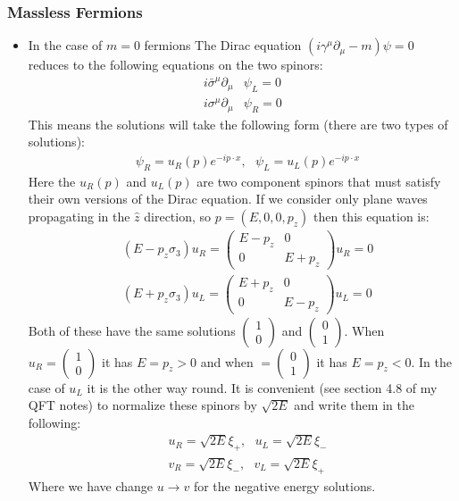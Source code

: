 \documentclass[11pt]{article}
\numberwithin{equation}{section}
\begin{document}
\subsubsection{Massless Fermions} %
\label{ssub:massless_fermions}
\begin{itemize}
    \item In the case of $m=0$ fermions The Dirac equation $(i\gamma^{\mu}\partial_{\mu}-m)\psi = 0$ reduces to the following equations on the two spinors:
    \begin{align*}
         i\bar{\sigma}^{\mu}\partial_{\mu}&\psi_{L} = 0 \\
      i\sigma^{\mu}\partial_{\mu}& \psi_{R} =0 
    \end{align*}
    This means the solutions will take the following form (there are two types of solutions):
    \begin{align}
    \label{spinor_ansatz}
        &\psi_{R} = u_{R}(p)e^{-ip \cdot x}, ~~~ \psi_{L} = u_{L}(p)e^{-ip \cdot x}
    \end{align}
    Here the $u_R(p)$ and $u_L(p)$  are two component spinors that must satisfy their own versions of the Dirac equation. If we consider only plane waves propagating in the $\hat{z}$ direction, so $p = (E,0,0,p_z)$ then this equation is:
    \begin{align*}
         & (E-p_z\sigma_3)u_R = \begin{pmatrix}
             E-p_z & 0  \\
             0 & E+ p_z
         \end{pmatrix}u_R = 0  \\
         & (E+p_z\sigma_3)u_L = \begin{pmatrix}
             E+p_z & 0  \\
             0 & E- p_z
         \end{pmatrix}u_L = 0  
     \end{align*} 
     Both of these have the same solutions $\begin{pmatrix}
         1 \\ 0
     \end{pmatrix}$ and $\begin{pmatrix}
         0 \\ 1
     \end{pmatrix}$. When $u_R = \begin{pmatrix}
         1 \\ 0
     \end{pmatrix}$ it has $E = p_z >0$ and when $ = \begin{pmatrix}
         0 \\ 1
     \end{pmatrix}$ it has $E = p_z<0$. In the case of $u_L$ it is the other way round. It is convenient (see section 4.8 of my QFT notes) to normalize these spinors by $\sqrt{2E}$ and write them in the following:
     \begin{align*}
          & u_R = \sqrt{2E}\xi_+, ~~~u_L = \sqrt{2E}\xi_- \\
          & v_R = \sqrt{2E}\xi_-, ~~~v_L = \sqrt{2E}\xi_+
      \end{align*}    
      Where we have change $u \rightarrow v$ for the negative energy solutions. 


\end{itemize}
\end{document}
